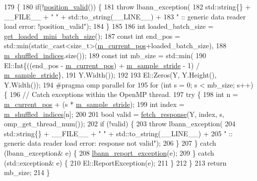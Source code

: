 \begin{DoxyCode}
179                                                     \{
180   \textcolor{keywordflow}{if}(!\hyperlink{classlbann_1_1generic__data__reader_a2b10538440d784f0f12582a5407acef2}{position\_valid}()) \{
181     \textcolor{keywordflow}{throw} lbann\_exception(
182       std::string\{\} + \_\_FILE\_\_ + \textcolor{stringliteral}{" "} + std::to\_string(\_\_LINE\_\_) +
183       \textcolor{stringliteral}{" :: generic data reader load error: !position\_valid"});
184   \}
185 
186   \textcolor{keywordtype}{int} loaded\_batch\_size = \hyperlink{classlbann_1_1generic__data__reader_a850e99110dd1e9df2985f09ea196fea8}{get\_loaded\_mini\_batch\_size}();
187   \textcolor{keyword}{const} \textcolor{keywordtype}{int} end\_pos = std::min(static\_cast<size\_t>(\hyperlink{classlbann_1_1generic__data__reader_a2facf4e410099ac8c1fa586e797ec2e0}{m\_current\_pos}+loaded\_batch\_size),
188                                \hyperlink{classlbann_1_1generic__data__reader_aaab6aeff67ffff1c689336851fec2c57}{m\_shuffled\_indices}.size());
189   \textcolor{keyword}{const} \textcolor{keywordtype}{int} mb\_size = std::min(
190     El::Int\{((end\_pos - \hyperlink{classlbann_1_1generic__data__reader_a2facf4e410099ac8c1fa586e797ec2e0}{m\_current\_pos}) + \hyperlink{classlbann_1_1generic__data__reader_a58461c39de7e17eafc5b98aec99cbb9b}{m\_sample\_stride} - 1) / 
      \hyperlink{classlbann_1_1generic__data__reader_a58461c39de7e17eafc5b98aec99cbb9b}{m\_sample\_stride}\},
191     Y.Width());
192 
193   El::Zeros(Y, Y.Height(), Y.Width());
194 \textcolor{preprocessor}{  #pragma omp parallel for}
195   \textcolor{keywordflow}{for} (\textcolor{keywordtype}{int} s = 0; s < mb\_size; s++) \{
196     \textcolor{comment}{// Catch exceptions within the OpenMP thread.}
197     \textcolor{keywordflow}{try} \{
198       \textcolor{keywordtype}{int} n = \hyperlink{classlbann_1_1generic__data__reader_a2facf4e410099ac8c1fa586e797ec2e0}{m\_current\_pos} + (s * \hyperlink{classlbann_1_1generic__data__reader_a58461c39de7e17eafc5b98aec99cbb9b}{m\_sample\_stride});
199       \textcolor{keywordtype}{int} index = \hyperlink{classlbann_1_1generic__data__reader_aaab6aeff67ffff1c689336851fec2c57}{m\_shuffled\_indices}[n];
200 
201       \textcolor{keywordtype}{bool} valid = \hyperlink{classlbann_1_1generic__data__reader_abe544ea807eed477f3636010d199b574}{fetch\_response}(Y, index, s, omp\_get\_thread\_num());
202       \textcolor{keywordflow}{if} (!valid) \{
203         \textcolor{keywordflow}{throw} lbann\_exception(
204           std::string\{\} + \_\_FILE\_\_ + \textcolor{stringliteral}{" "} + std::to\_string(\_\_LINE\_\_) +
205           \textcolor{stringliteral}{" :: generic data reader load error: response not valid"});
206       \}
207     \} \textcolor{keywordflow}{catch} (lbann\_exception& e) \{
208       \hyperlink{namespacelbann_aedccb3bf2d674ccb5573ab9960720731}{lbann\_report\_exception}(e);
209     \} \textcolor{keywordflow}{catch} (std::exception& e) \{
210       El::ReportException(e);
211     \}
212   \}
213   \textcolor{keywordflow}{return} mb\_size;
214 \}
\end{DoxyCode}
